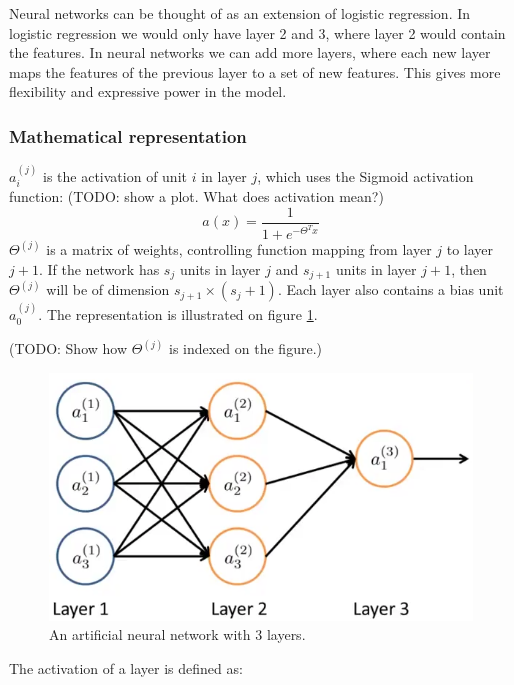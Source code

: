 Neural networks can be thought of as an extension of logistic regression.
In logistic regression we would only have layer 2 and 3, where layer 2 would contain the features.
In neural networks we can add more layers, where each new layer maps the features of the previous layer to a set of new features.
This gives more flexibility and expressive power in the model.

\subsubsection{Mathematical representation}

$a_i^{(j)}$ is the activation of unit $i$ in layer $j$, which uses the Sigmoid activation function: (TODO: show a plot. What does activation mean?)
\begin{equation}
a(x) = \dfrac{1}{1+e^{-{\Theta}^Tx}}
\end{equation}
$\Theta^{(j)}$ is a matrix of weights, controlling function mapping from layer $j$ to layer $j+1$.
If the network has $s_j$ units in layer $j$ and $s_{j+1}$ units in layer $j+1$, then $\Theta^{(j)}$ will be of dimension $s_{j+1}\times(s_j+1)$.
Each layer also contains a bias unit $a_0^{(j)}$.
The representation is illustrated on figure \ref{fig:neural-network-detailed}.

(TODO: Show how $\Theta^{(j)}$ is indexed on the figure.)

\begin{figure}[H]
\centering
\includegraphics[scale=.5]{billeder/neural-network-detailed}
\caption{An artificial neural network with 3 layers.}
\label{fig:neural-network-detailed}
\end{figure}

The activation of a layer is defined as:

